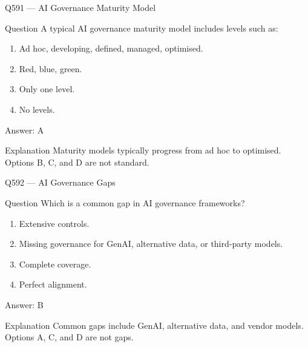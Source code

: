 \documentclass[aspectratio=169,8pt]{beamer}
\begin{document}
	\begin{frame}{Q591 --- AI Governance Maturity Model}
		\begin{block}{Question}
			A typical AI governance maturity model includes levels such as:
			\begin{enumerate}
				\item Ad hoc, developing, defined, managed, optimised.
				\item Red, blue, green.
				\item Only one level.
				\item No levels.
			\end{enumerate}
		\end{block}
		\begin{exampleblock}{Answer: A}\end{exampleblock}
		\begin{block}{Explanation}
			Maturity models typically progress from ad hoc to optimised. Options B, C, and D are not standard.
		\end{block}
	\end{frame}
	
	\begin{frame}{Q592 --- AI Governance Gaps}
		\begin{block}{Question}
			Which is a common gap in AI governance frameworks?
			\begin{enumerate}
				\item Extensive controls.
				\item Missing governance for GenAI, alternative data, or third-party models.
				\item Complete coverage.
				\item Perfect alignment.
			\end{enumerate}
		\end{block}
		\begin{exampleblock}{Answer: B}\end{exampleblock}
		\begin{block}{Explanation}
			Common gaps include GenAI, alternative data, and vendor models. Options A, C, and D are not gaps.
		\end{block}
	\end{frame}
	
\end{document}
